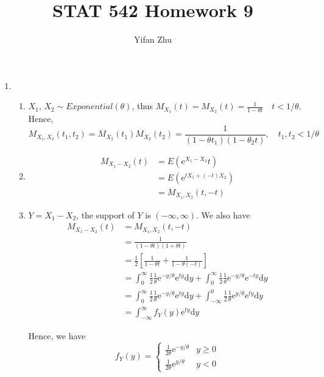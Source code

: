 \documentclass{article}
\begin{document}
	

	
	\title{STAT 542 Homework 9}
	\author{Yifan Zhu}
	\maketitle
	
	\begin{enumerate}[leftmargin = 0 em, label = \arabic*., font = \bfseries]
	\item 
	\begin{enumerate}
		\item $X_1,\, X_2 \sim Exponential(\theta)$, thus $M_{X_1} (t) = M_{X_2} (t) =  \frac{1}{1 - \theta t} \quad t < 1/\theta$. Hence,
		\[M_{X_1, X_2} (t_1, t_2) = M_{X_2} (t_1) M_{X_2} (t_2) = \frac{1}{(1 - \theta t_1) (1 - \theta_2 t)}, \quad t_1, t_2 < 1/\theta\]
		


		\item 
		\begin{align*}
		M_{X_1 - X_2} (t) & = E(\mathrm{e}^{X_1 - X_2}t)\\
		& = E(\mathrm{e}^{t X_1 + (-t) X_2})\\
		& = M_{X_1 , X_2} (t, -t)
		\end{align*}

		\item 
		$Y = X_1 - X_2$, the support of $Y$ is $(-\infty, \infty)$. We also have 
		\begin{align*}
		M_{X_1 - X_2}(t) & = M_{X_1, X_2}(t, -t)\\
		& = \frac{1}{(1 - \theta t)(1 + \theta t)}\\
		& = \frac{1}{2} [\frac{1}{1 - \theta t} + \frac{1}{1 - \theta (-t)}]\\
		& = \int_{0}^{\infty} \frac{1}{2} \frac{1}{\theta}\mathrm{e}^{-y/\theta} \mathrm{e}^{ty} \mathrm{d}y + \int_{0}^\infty \frac{1}{2} \frac{1}{\theta}\mathrm{e}^{-y/\theta} \mathrm{e}^{-ty} \mathrm{d}y\\
		& = \int_{0}^{\infty} \frac{1}{2} \frac{1}{\theta}\mathrm{e}^{-y/\theta} \mathrm{e}^{ty} \mathrm{d}y + \int_{-\infty}^0 \frac{1}{2} \frac{1}{\theta}\mathrm{e}^{y/\theta} \mathrm{e}^{ty} \mathrm{d}y\\
		& = \int_{-\infty}^\infty f_Y (y) \mathrm{e}^{ty} \mathrm{d}y
		\end{align*}

		Hence, we have 
		\[f_Y (y) = \begin{cases}
			\frac{1}{2\theta}\mathrm{e}^{-y/\theta} & y \geq 0\\
		     \frac{1}{2\theta}\mathrm{e}^{y/\theta} & y < 0
		\end{cases}\]
		

\end{enumerate}
\end{enumerate}
\end{document}
